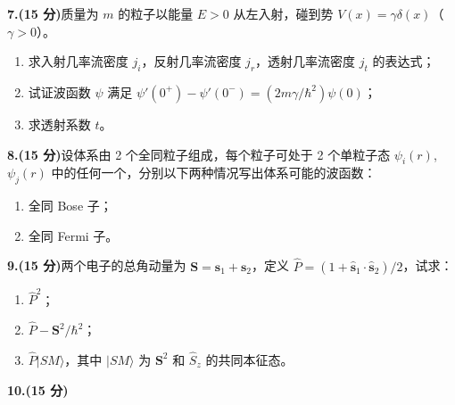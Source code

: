 \textbf{7.(15 分)}质量为 $m$ 的粒子以能量 $E > 0$ 从左入射，碰到势 $V(x) = \gamma \delta(x)$（$\gamma > 0$）。

\begin{enumerate}
    \item 求入射几率流密度 $j_i$，反射几率流密度 $j_r$，透射几率流密度 $j_t$ 的表达式；
    \item 试证波函数 $\psi$ 满足 $\psi'(0^+) - \psi'(0^-) = (2m\gamma/\hbar^2)\psi(0)$；
    \item 求透射系数 $t$。
\end{enumerate}

\textbf{8.(15 分)}设体系由 2 个全同粒子组成，每个粒子可处于 2 个单粒子态 $\psi_i(r)$, $\psi_j(r)$ 中的任何一个，分别以下两种情况写出体系可能的波函数：

\begin{enumerate}
    \item 全同 Bose 子；
    \item 全同 Fermi 子。
\end{enumerate}

\textbf{9.(15 分)}两个电子的总角动量为 $\mathbf{S} = \mathbf{s}_1 + \mathbf{s}_2$，定义 $\hat{P} = (1 + \hat{\mathbf{s}}_1 \cdot \hat{\mathbf{s}}_2)/2$，试求：

\begin{enumerate}
    \item  $\hat{P}^2$；
    \item  $\hat{P} - \mathbf{S}^2/\hbar^2$；
    \item  $\hat{P}|SM\rangle$，其中 $|SM\rangle$ 为 $\mathbf{S}^2$ 和 $\hat{S}_z$ 的共同本征态。
\end{enumerate}

\textbf{10.(15 分)}